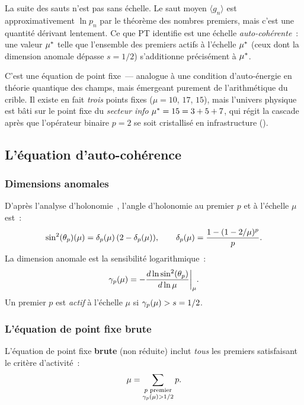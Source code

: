 \documentclass[12pt,a4paper]{article}
\begin{document}
La suite des sauts n'est pas sans échelle. Le saut moyen
$\langle g_n \rangle$ est approximativement $\ln p_n$ par le théorème
des nombres premiers, mais c'est une quantité dérivant lentement.
Ce que PT identifie est une échelle \emph{auto-cohérente}~: une
valeur ${\mu^{*}}$ telle que l'ensemble des premiers actifs à
l'échelle ${\mu^{*}}$ (ceux dont la dimension anomale dépasse
$s = 1/2$) s'additionne précisément à ${\mu^{*}}$.

C'est une équation de point fixe~--- analogue à une condition
d'auto-énergie en théorie quantique des champs, mais émergeant
purement de l'arithmétique du crible. Il existe en fait \emph{trois}
points fixes ($\mu = 10$, $17$, $15$), mais l'univers physique est
bâti sur le point fixe du \emph{secteur info} ${\mu^{*}} = 15 = 3 + 5 + 7$,
qui régit la cascade après que l'opérateur binaire $p = 2$ se soit
cristallisé en infrastructure (\cite{companion_M1}).

\subsection{L'équation d'auto-cohérence}
\label{sec:ch8_self_consistency}

\subsubsection{Dimensions anomales}

D'après l'analyse d'holonomie~\cite{companion_M2}, l'angle d'holonomie
au premier $p$ et à l'échelle $\mu$ est~:
\begin{equation}
  \sin^2(\theta_{p})(\mu) = \delta_p(\mu)\,(2 - \delta_p(\mu)),
  \qquad \delta_p(\mu) = \frac{1 - (1 - 2/\mu)^p}{p}.
  \label{eq:holonomy_angle}
\end{equation}
La dimension anomale est la sensibilité logarithmique~:
\begin{equation}
  \gamma_{p}(\mu) = -\frac{d\ln\sin^2(\theta_{p})}{d\ln\mu}\biggr|_\mu.
  \label{eq:gamma_def}
\end{equation}
Un premier $p$ est \emph{actif} à l'échelle $\mu$ si
$\gamma_{p}(\mu) > s = 1/2$.

\subsubsection{L'équation de point fixe brute}
\label{sec:ch8_raw_fp}

L'équation de point fixe \textbf{brute} (non réduite) inclut
\emph{tous} les premiers satisfaisant le critère d'activité~:
\begin{equation}
  \mu = \sum_{\substack{p \text{ premier} \\ \gamma_{p}(\mu) > 1/2}} p.
  \label{eq:fixed_point_raw}
\end{equation}
\end{document}
